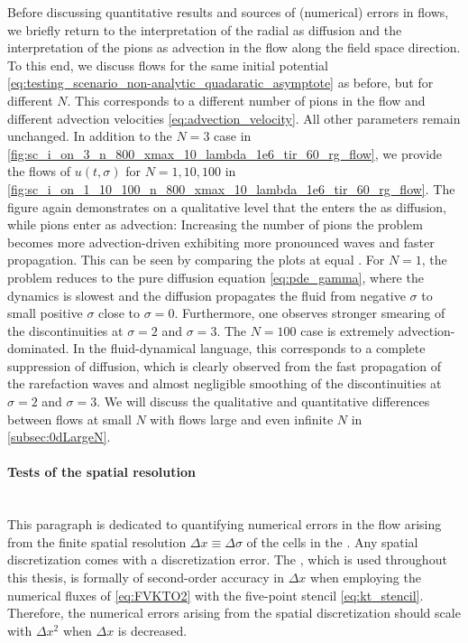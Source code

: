 Before discussing quantitative results and sources of (numerical) errors in \frg{} flows, we briefly return to the interpretation of the radial \sigmaMode{} as diffusion and the interpretation of the pions as advection in the \frg{} flow along the field space direction.
To this end, we discuss \frg{} flows for the same \uv{} initial potential \eqref{eq:testing_scenario_non-analytic_quadaratic_asymptote} as before, but for different $N$.
This  corresponds to a different number of pions in the flow and different advection velocities \eqref{eq:advection_velocity}.
All other parameters remain unchanged.
In addition to the $N = 3$ case in \cref{fig:sc_i_on_3_n_800_xmax_10_lambda_1e6_tir_60_rg_flow}, we provide the \frg{} flows of $u ( t, \sigma )$ for $N = 1, 10, 100$ in \cref{fig:sc_i_on_1_10_100_n_800_xmax_10_lambda_1e6_tir_60_rg_flow}.
The figure again demonstrates on a qualitative level that the \sigmaMode{} enters the \frg{} as diffusion, while pions enter as advection: Increasing the number of pions the problem becomes more advection-driven exhibiting more pronounced waves and faster propagation.
This can be seen by comparing the plots at equal \rgtimes{}.
For $N = 1$, the problem reduces to the pure diffusion equation \eqref{eq:pde_gamma}, where the dynamics is slowest and the diffusion propagates the fluid from negative $\sigma$ to small positive $\sigma$ close to $\sigma = 0$.
Furthermore, one observes stronger smearing of the discontinuities at $\sigma = 2$ and $\sigma = 3$.
The $N = 100$ case is extremely advection-dominated.
In the fluid-dynamical language, this corresponds to a complete suppression of diffusion, which is clearly observed from the fast propagation of the rarefaction waves and almost negligible smoothing of the discontinuities at $\sigma = 2$ and $\sigma = 3$.
We will discuss the qualitative and quantitative differences between \frg{} flows at small $N$ with flows large and even infinite $N$ in \cref{subsec:0dLargeN}.

\paragraph{Tests of the spatial resolution}\label{paragraph:ONdeltax}\mbox{}\\%
This paragraph is dedicated to quantifying numerical errors in the \frg{} flow arising from the finite spatial resolution $\Delta x\equiv \Delta \sigma$ of the cells in the \ktScheme{}.
Any spatial discretization comes with a discretization error.
The \ktScheme{}, which is used throughout this thesis, is formally of second-order accuracy in $\Delta x$ when employing the numerical fluxes of \cref{eq:FVKTO2} with the five-point stencil \eqref{eq:kt_stencil}.
Therefore, the numerical errors arising from the spatial discretization should scale with $\Delta x^2$ when $\Delta x$ is decreased.

